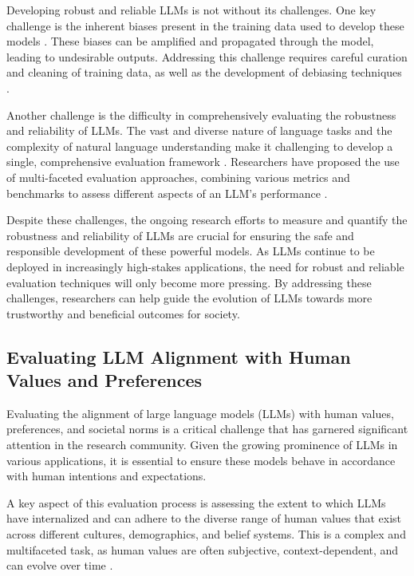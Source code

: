 \documentclass[11pt]{article}
\begin{document}
Developing robust and reliable LLMs is not without its challenges. One key challenge is the inherent biases present in the training data used to develop these models \cite{ref48}. These biases can be amplified and propagated through the model, leading to undesirable outputs. Addressing this challenge requires careful curation and cleaning of training data, as well as the development of debiasing techniques \cite{ref148}.

Another challenge is the difficulty in comprehensively evaluating the robustness and reliability of LLMs. The vast and diverse nature of language tasks and the complexity of natural language understanding make it challenging to develop a single, comprehensive evaluation framework \cite{ref157}. Researchers have proposed the use of multi-faceted evaluation approaches, combining various metrics and benchmarks to assess different aspects of an LLM's performance \cite{ref158}.

Despite these challenges, the ongoing research efforts to measure and quantify the robustness and reliability of LLMs are crucial for ensuring the safe and responsible development of these powerful models. As LLMs continue to be deployed in increasingly high-stakes applications, the need for robust and reliable evaluation techniques will only become more pressing. By addressing these challenges, researchers can help guide the evolution of LLMs towards more trustworthy and beneficial outcomes for society.

\subsection{Evaluating LLM Alignment with Human Values and Preferences}

Evaluating the alignment of large language models (LLMs) with human values, preferences, and societal norms is a critical challenge that has garnered significant attention in the research community. Given the growing prominence of LLMs in various applications, it is essential to ensure these models behave in accordance with human intentions and expectations.

A key aspect of this evaluation process is assessing the extent to which LLMs have internalized and can adhere to the diverse range of human values that exist across different cultures, demographics, and belief systems. This is a complex and multifaceted task, as human values are often subjective, context-dependent, and can evolve over time \cite{ref159}.
\end{document}
